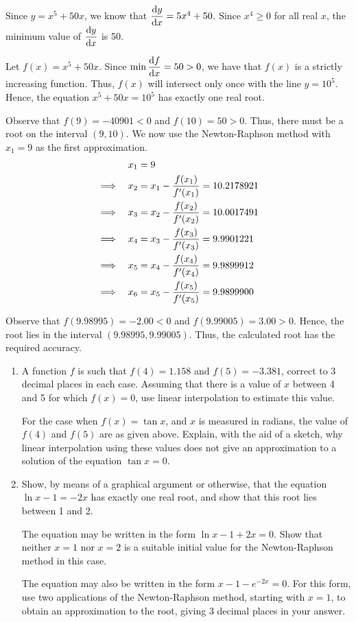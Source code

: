 \documentclass{echw}
\begin{document}
    \solution
        Since $y = x^5 + 50x$, we know that $\dfrac{\mathrm{d} y}{\mathrm{d} x} = 5x^4 + 50$. Since $x^4 \geq 0$ for all real $x$, the minimum value of $\dfrac{\mathrm{d} y}{\mathrm{d} x}$ is 50.


        Let $f(x) = x^5 + 50x$. Since $\min \dfrac{\mathrm{d} f}{\mathrm{d} x} = 50 > 0$, we have that $f(x)$ is a strictly increasing function. Thus, $f(x)$ will intersect only once with the line $y = 10^5$. Hence, the equation $x^5 + 50x = 10^5$ has exactly one real root.

        Observe that $f(9) = -40901 < 0$ and $f(10) = 50 > 0$. Thus, there must be a root on the interval $(9, 10)$. We now use the Newton-Raphson method with $x_1 = 9$ as the first approximation.
        \begin{alignat*}{2}
            && x_1 &= 9 \\
            \implies&&x_2 &= x_1 - \dfrac{f(x_1)}{f^\prime(x_1)} = 10.2178921 \\
            \implies&&x_3 &= x_2 - \dfrac{f(x_2)}{f^\prime(x_2)} = 10.0017491 \\
            \implies&&x_4 &= x_3 - \dfrac{f(x_3)}{f^\prime(x_3)} = 9.9901221 \\
            \implies&&x_5 &= x_4 - \dfrac{f(x_4)}{f^\prime(x_4)} = 9.9899912 \\
            \implies&&x_6 &= x_5 - \dfrac{f(x_5)}{f^\prime(x_5)} = 9.9899900 
        \end{alignat*}


        Observe that $f(9.98995) = -2.00 < 0$ and $f(9.99005) = 3.00 > 0$. Hence, the root lies in the interval $(9.98995, 9.99005)$. Thus, the calculated root has the required accuracy.

    \problem{}
        \begin{enumerate}
            \item A function $f$ is such that $f(4) = 1.158$ and $f(5) = -3.381$, correct to 3 decimal places in each case. Assuming that there is a value of $x$ between 4 and 5 for which $f(x) = 0$, use linear interpolation to estimate this value.
            
            For the case when $f(x) = \tan x$, and $x$ is measured in radians, the value of $f(4)$ and $f(5)$ are as given above. Explain, with the aid of a sketch, why linear interpolation using these values does not give an approximation to a solution of the equation $\tan x = 0$.

            \item Show, by means of a graphical argument or otherwise, that the equation $\ln{x-1} = -2x$ has exactly one real root, and show that this root lies between 1 and 2. 
            
            The equation may be written in the form $\ln{x-1} + 2x = 0$. Show that neither $x=1$ nor $x=2$ is a suitable initial value for the Newton-Raphson method in this case.

            The equation may also be written in the form $x - 1 - e^{-2x} = 0$. For this form, use two applications of the Newton-Raphson method, starting with $x=1$, to obtain an approximation to the root, giving 3 decimal places in your answer.
        \end{enumerate}
\end{document}
